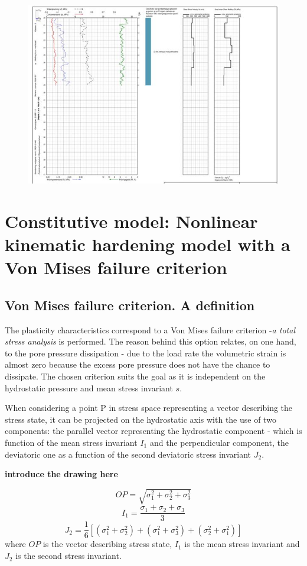 \documentclass[10pt,a4paper]{report}
\begin{document}
\begin{figure}[h!]
	\centering
	\includegraphics[width=0.8\linewidth]{"cpt2"}
\end{figure}

\newpage
\chapter{Constitutive model: Nonlinear kinematic hardening model with a Von Mises failure criterion} \label{App:AppendixB}
\section{Von Mises failure criterion. A definition}
The plasticity characteristics correspond to a Von Mises failure criterion -\textit{a total stress analysis } is performed. The reason behind this option relates, on one hand, to the pore pressure dissipation - due to the load rate the volumetric strain is almost zero because the excess pore pressure does not have the chance to dissipate.  The chosen criterion suits the goal as it is independent on the hydrostatic pressure and mean stress invariant $s$.

When considering a point P in stress space representing a vector describing the stress state, it can be projected on the hydrostatic axis with the use of two components: the parallel vector representing the hydrostatic component - which is function of the mean stress invariant $I_1$ and the perpendicular component, the deviatoric one as a function of the second deviatoric stress invariant $J_2$.

\textbf{introduce the drawing here}

\begin{equation}
	OP=\sqrt{\sigma_1^2+\sigma_2^2+\sigma_3^2}
\end{equation}
\begin{equation}
	I_1=\frac{\sigma_1+\sigma_2+\sigma_3}{3} 	
\end{equation}
\begin{equation}
	 J_2=\frac{1}{6}[(\sigma_1^2+\sigma_2^2)+(\sigma_1^2+\sigma_3^2)+(\sigma_2^2+\sigma_1^2)] 
\end{equation}
where
$OP$ is  the vector describing stress state, $I_1$ is the mean stress invariant and $J_2$ is the second stress invariant.
\end{document}
